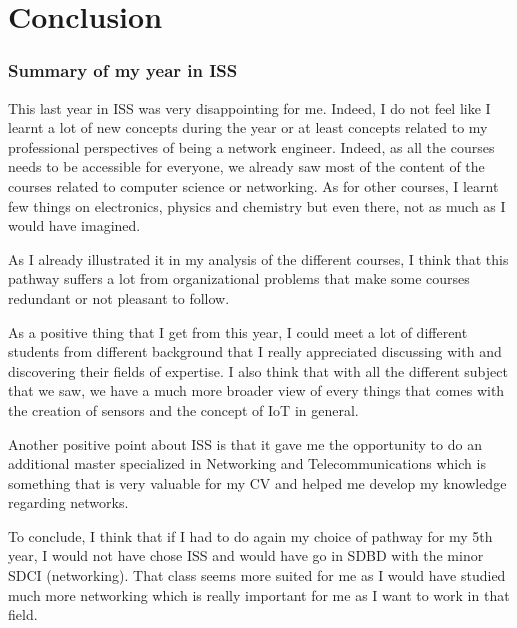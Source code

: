 \part{Conclusion}

\section{Summary of my year in ISS}

This last year in ISS was very disappointing for me. Indeed, I do not feel like I learnt a lot of new concepts during the year or at least concepts related to my professional perspectives of being a network engineer. Indeed, as all the courses needs to be accessible for everyone, we already saw most of the content of the courses related to computer science or networking. As for other courses, I learnt few things on electronics, physics and chemistry but even there, not as much as I would have imagined. \par
As I already illustrated it in my analysis of the different courses, I think that this pathway suffers a lot from organizational problems that make some courses redundant or not pleasant to follow. \\\par

As a positive thing that I get from this year, I could meet a lot of different students from different background that I really appreciated discussing with and discovering their fields of expertise. I also think that with all the different subject that we saw, we have a much more broader view of every things that comes with the creation of sensors and the concept of IoT in general. \par
Another positive point about ISS is that it gave me the opportunity to do an additional master specialized in Networking and Telecommunications which is something that is very valuable for my CV and helped me develop my knowledge regarding networks. 
\\\par
To conclude, I think that if I had to do again my choice of pathway for my 5th year, I would not have chose ISS and would have go in SDBD with the minor SDCI (networking). That class seems more suited for me as I would have studied much more networking which is really important for me as I want to work in that field.